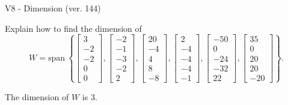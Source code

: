\begin{exercise}
  \begin{exerciseTitle}V8 - Dimension (ver. 144)\end{exerciseTitle}
  \begin{exerciseStatement}
    Explain how to find the dimension of 
\[W=\mathrm{span}\ \left\{\left[\begin{array}{r}
3 \\
-2 \\
-2 \\
0 \\
0
\end{array}\right] , \left[\begin{array}{r}
-2 \\
-1 \\
-3 \\
-2 \\
2
\end{array}\right] , \left[\begin{array}{r}
20 \\
-4 \\
4 \\
8 \\
-8
\end{array}\right] , \left[\begin{array}{r}
2 \\
-4 \\
-4 \\
-4 \\
-1
\end{array}\right] , \left[\begin{array}{r}
-50 \\
0 \\
-24 \\
-32 \\
22
\end{array}\right] , \left[\begin{array}{r}
35 \\
0 \\
20 \\
20 \\
-20
\end{array}\right]\right\}.\]



  \end{exerciseStatement}
  \begin{exerciseAnswer}
   The dimension of \(W\) is  \(3\).
  


  \end{exerciseAnswer}
\end{exercise}